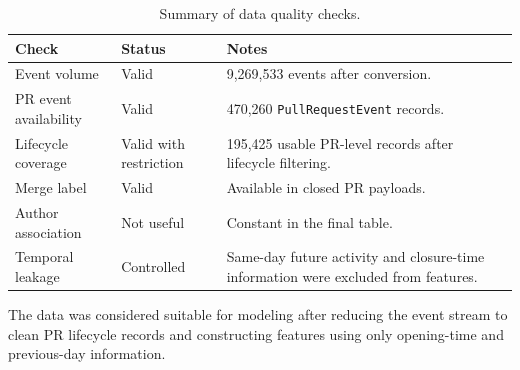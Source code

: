 \begin{table}[H]
    \centering
    \caption{Summary of data quality checks.}
    \label{tab:data_quality_summary}
    \begin{tabularx}{\textwidth}{lXX}
        \toprule
        Check & Status & Notes \\
        \midrule
        Event volume & Valid & 9,269,533 events after conversion. \\
        PR event availability & Valid & 470,260 \texttt{PullRequestEvent} records. \\
        Lifecycle coverage & Valid with restriction & 195,425 usable PR-level records after lifecycle filtering. \\
        Merge label & Valid & Available in closed PR payloads. \\
        Author association & Not useful & Constant in the final table. \\
        Temporal leakage & Controlled & Same-day future activity and closure-time information were excluded
        from features. \\
        \bottomrule
    \end{tabularx}
\end{table}

The data was considered suitable for modeling after reducing the event stream to clean PR lifecycle records
and constructing features using only opening-time and previous-day information.
